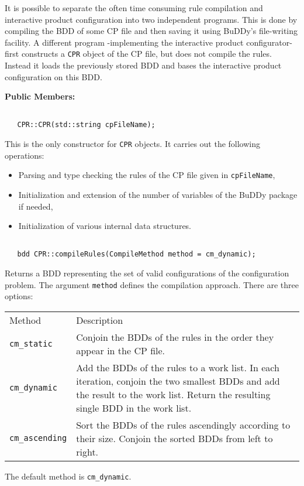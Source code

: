 \documentclass{article}
\begin{document}
It is possible to separate the often time consuming rule compilation
and interactive product configuration into two independent
programs. This is done by compiling the BDD of some CP file and then
saving it using BuDDy's file-writing facility. A different program
-implementing the interactive product configurator- first constructs a
\texttt{CPR} object of the CP file, but does not compile the
rules. Instead it loads the previously stored BDD and bases the
interactive product configuration on this BDD.
 

\vspace{1cm}
\noindent
{\bf Public Members:}

\noindent
\hrulefill

\begin{verbatim}

   CPR::CPR(std::string cpFileName);

\end{verbatim}
This is the only constructor for \texttt{CPR} objects. It carries out
the following operations:
\begin{itemize}
 \item Parsing and type checking the rules of the CP file given in \texttt{cpFileName}, 
 \item Initialization and extension of the number of variables of the BuDDy package
       if needed,
 \item Initialization of various internal data structures.
\end{itemize} 

\noindent
\hrulefill

\begin{verbatim}

   bdd CPR::compileRules(CompileMethod method = cm_dynamic);

\end{verbatim}
Returns a BDD representing the set of valid configurations of the configuration problem.
The argument \texttt{method} defines the compilation approach. There are three options:
\begin{center}
\begin{tabular}{lp{11.0cm}}
Method                & Description \\
\texttt{cm\_static}    & Conjoin the BDDs of the rules in the order they appear in the CP file. \\
\texttt{cm\_dynamic}   & Add the BDDs of the rules to a work list. In each iteration, conjoin 
                         the two smallest BDDs and add the result to the work list. 
                         Return the resulting single BDD in the work list.\\
\texttt{cm\_ascending} & Sort the BDDs of the rules ascendingly according to their size. Conjoin 
                         the sorted BDDs from left to right.
\end{tabular}
\end{center}
The default method is \texttt{cm\_dynamic}.
\end{document}
